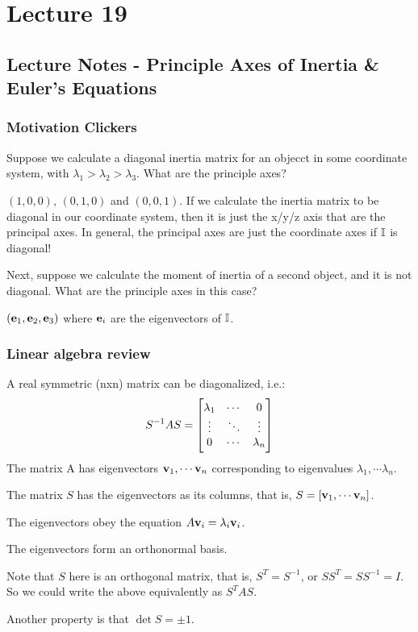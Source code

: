 \documentclass[../PHYS306Notes.tex]{subfiles}
\begin{document}
\section{Lecture 19}
\subsection{Lecture Notes - Principle Axes of Inertia \& Euler's Equations}
\subsubsection{Motivation Clickers}
Suppose we calculate a diagonal inertia matrix for an objecct in some coordinate system, with $\lambda_1 > \lambda_2 > \lambda_3$. What are the principle axes?
\begin{s}
$(1, 0, 0)$, $(0, 1, 0)$ and $(0, 0, 1)$. If we calculate the inertia matrix to be diagonal in our coordinate system, then it is just the x/y/z axis that are the principal axes. In general, the principal axes are just the coordinate axes if $\mathbb{I}$ is diagonal!
\end{s}
Next, suppose we calculate the moment of inertia of a second object, and it is not diagonal. What are the principle axes in this case?
\begin{s}
$(\mathbf{e}_1, \mathbf{e}_2, \mathbf{e}_3)$ where $\mathbf{e}_i$ are the eigenvectors of $\mathbb{I}$.
\end{s}

\subsubsection{Linear algebra review}
A real symmetric (nxn) matrix can be diagonalized, i.e.:
\[S^{-1}AS = \begin{bmatrix}\lambda_1 &  \cdots &  0 \\ \vdots & \ddots & \vdots \\ 0 & \cdots & \lambda_n\end{bmatrix}\]
The matrix A has eigenvectors $\mathbf{v}_1, \cdots \mathbf{v}_n$ corresponding to eigenvalues $\lambda_1, \cdots \lambda_n$. 

The matrix $S$ has the eigenvectors as its columns, that is, $S = [\mathbf{v}_1, \cdots \mathbf{v}_n]$. 

The eigenvectors obey the equation $A\mathbf{v}_i = \lambda_i\mathbf{v}_i$. 

The eigenvectors form an orthonormal basis. 

Note that $S$ here is an orthogonal matrix, that is, $S^T = S^{-1}$, or $SS^T = SS^{-1} = I$. So we could write the above equivalently as $S^{T}AS$. 

Another property is that $\det S = \pm 1$.
\end{document}
